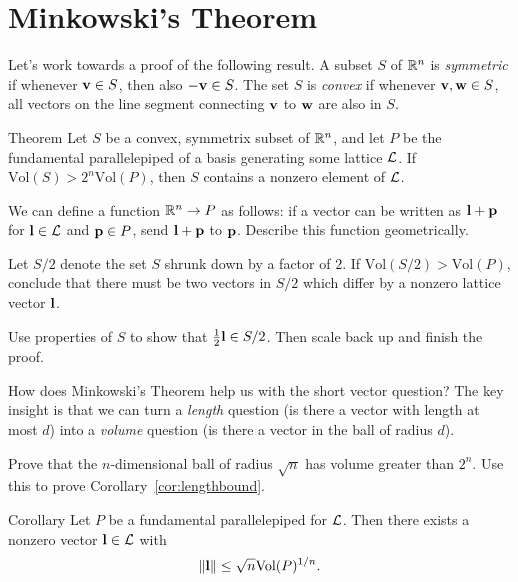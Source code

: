 \section*{Minkowski's Theorem}

Let's work towards a proof of the following result. A subset $S$ of $\mathbb{R}^n$ is \emph{symmetric} if whenever $\mathbf{v}\in S$, then also $-\mathbf{v}\in S$. The set $S$ is \emph{convex} if whenever $\mathbf{v},\mathbf{w}\in S$, all vectors on the line segment connecting $\mathbf{v}$ to $\mathbf{w}$ are also in $S$.

\begin{toprove}{Theorem}\label{thm:minkowski}
	Let $S$ be a convex, symmetrix subset of $\mathbb{R}^n$, and let $P$ be the fundamental parallelepiped of a basis generating some lattice $\mathcal{L}$. If $\text{Vol}(S)>2^n\text{Vol}(P)$, then $S$ contains a nonzero element of $\mathcal{L}$.
\end{toprove}

\begin{explor}
	We can define a function $\mathbb{R}^n\to P$ as follows: if a vector can be written as $\mathbf{l}+\mathbf{p}$ for $\mathbf{l}\in\mathcal{L}$ and $\mathbf{p}\in P$, send $\mathbf{l}+\mathbf{p}$ to $\mathbf{p}$. Describe this function geometrically.
\end{explor}

\begin{explor}
	Let $S/2$ denote the set $S$ shrunk down by a factor of $2$. If $\text{Vol}(S/2)>\text{Vol}(P)$, conclude that there must be two vectors in $S/2$ which differ by a nonzero lattice vector $\mathbf{l}$.
\end{explor}

\begin{explor}
	Use properties of $S$ to show that $\frac12\mathbf{l}\in S/2$. Then scale back up and finish the proof. 
\end{explor}

How does Minkowski's Theorem help us with the short vector question? The key insight is that we can turn a \emph{length} question (is there a vector with length at most $d$) into a \emph{volume} question (is there a vector in the ball of radius $d$). 

\begin{explor}
	Prove that the $n$-dimensional ball of radius $\sqrt{n}$ has volume greater than $2^n$. Use this to prove Corollary~\ref{cor:lengthbound}.
\end{explor}

\begin{toprove}[\color{white}(of Theorem~{\hypersetup{linkcolor=white}\ref{thm:minkowski}})]{Corollary}\label{cor:lengthbound}
	Let $P$ be a fundamental parallelepiped for $\mathcal{L}$. Then there exists a nonzero vector $\mathbf{l}\in\mathcal{L}$ with
	\[\|\mathbf{l}\|\leq \sqrt{n}\text{Vol}(P)^{1/n}.\]
\end{toprove}

